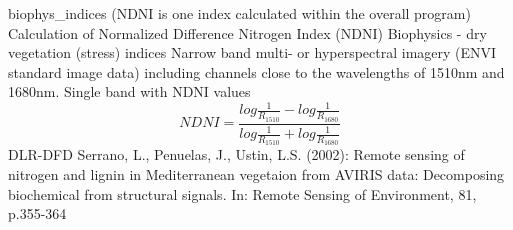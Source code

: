 %
{ %
biophys\_indices (NDNI is one index calculated within the overall program)
}
%
{ %
Calculation of Normalized Difference Nitrogen Index (NDNI)
}
%
{ %
Biophysics - dry vegetation (stress) indices
}
%
{ %
Narrow band multi- or hyperspectral imagery (ENVI standard image data) including channels close to the wavelengths of 1510nm and 1680nm.\bigskip
}
%
{ %
Single band with NDNI values
}
%
{ %
\begin{displaymath}
NDNI = \frac{log\frac{1}{R_{1510}}- log\frac{1}{R_{1680}} } {log\frac{1}{R_{1510}} + log\frac{1}{R_{1680}}}
\end{displaymath}
}
%
{ %
DLR-DFD
}
%
{ %
Serrano, L., Penuelas, J., Ustin, L.S. (2002): Remote sensing of nitrogen and lignin in Mediterranean vegetaion from AVIRIS data: Decomposing biochemical from structural signals. In: Remote Sensing of Environment, 81, p.355-364
}
